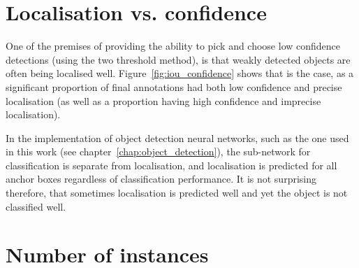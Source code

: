\section{Localisation vs. confidence}
\label{sec:localisation_confidence}

One of the premises of providing the ability to pick and choose low confidence detections (using the two threshold method), is that weakly detected objects are often being localised well. Figure~\ref{fig:iou_confidence} shows that is the case, as a significant proportion of final annotations had both low confidence and  precise localisation (as well as a proportion having high confidence and imprecise localisation).


\begin{table}[h]
\caption{Breakdown by dataset of detections included as an annotation; confident if $ p > 0.7 $, precise if $ IoU > 0.85 $ with respect to final annotation} 
    \centering
\noindent{}
\label{tab:confidence_precision}
\end{table}

In the implementation of object detection neural networks, such as the one used in this work (see chapter~\ref{chap:object_detection}), the sub-network for classification is separate from localisation, and localisation is predicted for all anchor boxes regardless of classification performance. It is not surprising therefore, that sometimes localisation is predicted well and yet the object is not classified well.


\section{Number of instances}
\label{sec:instances_discussion}


